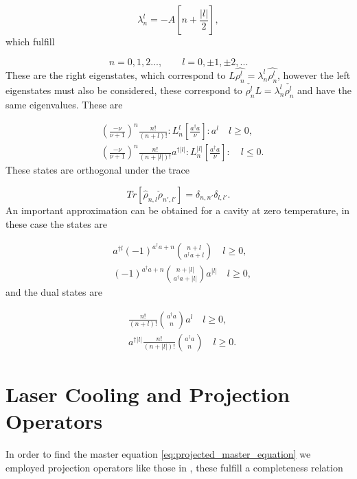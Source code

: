 \documentclass[reprint, amsmath,amssymb, aps,pra]{revtex4-1}
\begin{document}
\begin{equation}
\lambda_n^l = -A[n + \frac{|l|}{2}],
\end{equation} which fulfill

\begin{equation}
n=0,1,2...,\qquad l = 0,\pm 1, \pm 2,... 
\end{equation} These are the right eigenstates, which correspond to $L\hat{\rho_n^l} = \lambda_n^l\hat{\rho_n^l}$, however the left eigenstates must also be considered, these correspond to $\check{\rho_n^l}L = \lambda_n^l\check{\rho_n^l}$ and have the same eigenvalues. These are

\begin{align}\label{DefDBDual}
&(\frac{-\nu}{\nu+1})^n\frac{n!}{(n+l)!}:L_n^l[\frac{a^\dagger a}{\nu}]:a^{l}\quad l \geq 0, \\
&(\frac{-\nu}{\nu+1})^n\frac{n!}{(n+|l|)!}a^{\dagger|l|}:L_n^{|l|}[\frac{a^\dagger a}{\nu}]:\quad l \leq 0.
\end{align} These states are orthogonal under the trace

\begin{equation}
Tr[\hat{\rho}_{n,l}\check{\rho}_{n',l'}] = \delta_{n,n'}\delta_{l,l'}.
\end{equation} An important approximation can be obtained for a cavity at zero temperature, in these case the states are \cite{EnglertDB}

\begin{align}\label{DefDBZero}
&a^{\dagger l}(-1)^{a^\dagger a + n}\binom{n+l}{a^\dagger a+l} \quad l \geq 0, \\
&(-1)^{a^\dagger a + n}\binom{n+|l|}{a^\dagger a+|l|}a^{|l|} \quad l \geq 0,
\end{align} and the dual states are

\begin{align}\label{DefDBDualZero}
&\frac{n!}{(n+l)!}\binom{a^\dagger a}{n}a^l \quad l \geq 0, \\
&a^{\dagger|l|}\frac{n!}{(n+|l|)!}\binom{a^\dagger a}{n} \quad l \geq 0.
\end{align}

\section{Laser Cooling and Projection Operators}\label{CoolingAppendix}

In order to find the master equation
\eqref{eq:projected_master_equation} we employed projection operators
like those in \cite{CarmichaelQO}, these fulfill a completeness
relation
\end{document}
